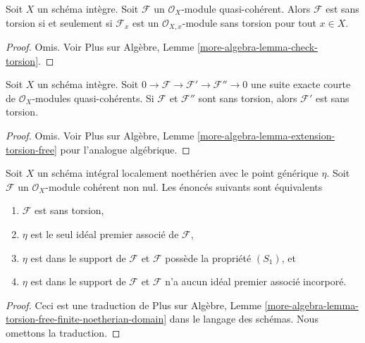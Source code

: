 \begin{lemma}
\label{lemma-check-torsion}
Soit  $X$  un schéma intègre. Soit  $\mathcal{F}$  un  $\mathcal{O}_X$-module
quasi-cohérent. Alors  $\mathcal{F}$  est sans torsion si et seulement si
 $\mathcal{F}_x$  est un  $\mathcal{O}_{X, x}$-module sans torsion pour tout  $x \in X$.
\end{lemma}

\begin{proof}
Omis. Voir Plus sur Algèbre, Lemme  \ref{more-algebra-lemma-check-torsion}.
\end{proof}

\begin{lemma}
\label{lemma-extension-torsion-free}
Soit  $X$  un schéma intègre. Soit  $0 \to \mathcal{F} \to \mathcal{F}' \to \mathcal{F}'' \to 0$  une suite exacte courte de
 $\mathcal{O}_X$-modules quasi-cohérents. Si  $\mathcal{F}$  et  $\mathcal{F}''$  sont sans
torsion, alors  $\mathcal{F}'$  est sans torsion.
\end{lemma}

\begin{proof}
Omis. Voir Plus sur Algèbre, Lemme  \ref{more-algebra-lemma-extension-torsion-free}  pour l'analogue algébrique.
\end{proof}

\begin{lemma}
\label{lemma-torsion-free-finite-noetherian-domain}
Soit  $X$  un schéma intégral localement noethérien avec le point générique
 $\eta$. Soit  $\mathcal{F}$  un  $\mathcal{O}_X$-module cohérent non nul. Les
énoncés suivants sont équivalents
\begin{enumerate}
\item $\mathcal{F}$  est sans torsion,
\item $\eta$  est le seul idéal premier associé de  $\mathcal{F}$,
\item $\eta$  est dans le support de  $\mathcal{F}$  et  $\mathcal{F}$  possède la
propriété  $(S_1)$, et
\item $\eta$  est dans le support de  $\mathcal{F}$  et  $\mathcal{F}$  n'a aucun idéal
premier associé incorporé.
\end{enumerate}
\end{lemma}

\begin{proof}
Ceci est une traduction de Plus sur Algèbre, Lemme  \ref{more-algebra-lemma-torsion-free-finite-noetherian-domain}  dans le langage
des schémas. Nous omettons la traduction.
\end{proof}

